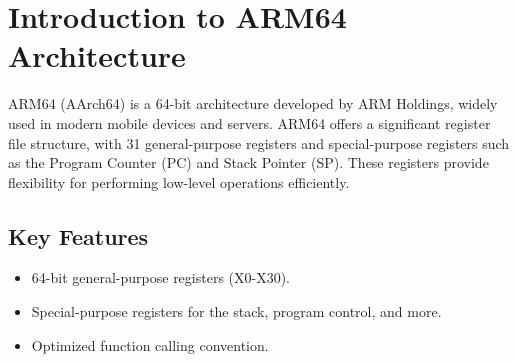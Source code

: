 \section{Introduction to ARM64 Architecture}
ARM64 (AArch64) is a 64-bit architecture developed by ARM Holdings, widely used in modern mobile devices and servers. ARM64 offers a significant register file structure, with 31 general-purpose registers and special-purpose registers such as the Program Counter (PC) and Stack Pointer (SP). These registers provide flexibility for performing low-level operations efficiently.

\subsection{Key Features}
\begin{itemize}
	\item 64-bit general-purpose registers (X0-X30).
	\item Special-purpose registers for the stack, program control, and more.
	\item Optimized function calling convention.
\end{itemize}

